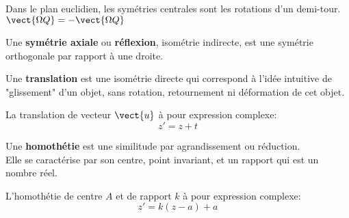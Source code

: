 Dans le plan euclidien, les symétries centrales sont les rotations d'un demi-tour.
$\vect{\Omega Q} = -\vect{\Omega Q}$

Une \textbf{symétrie axiale} ou \textbf{réflexion}, isométrie indirecte,
est une symétrie orthogonale par rapport à une droite.

Une \textbf{translation} est une isométrie directe 
qui correspond à l'idée intuitive de "glissement" d'un objet, sans rotation, retournement ni déformation de cet objet.

La translation de vecteur $\vect{u}$ à pour expression complexe:
\begin{equation*}
    z' = z + t
\end{equation*}

Une \textbf{homothétie} est une similitude par agrandissement ou réduction.\\
Elle se caractérise par son centre, point invariant, et un rapport qui est un nombre réel.

L'homothétie de centre $A$ et de rapport $k$ à pour expression complexe:
\begin{equation*}
    z'= k(z-a) + a
\end{equation*}
